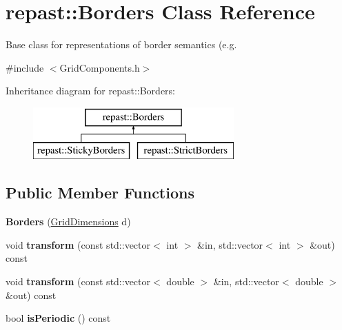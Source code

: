 \hypertarget{classrepast_1_1_borders}{\section{repast\-:\-:Borders Class Reference}
\label{classrepast_1_1_borders}
}


Base class for representations of border semantics (e.\-g.  




{\ttfamily \#include $<$Grid\-Components.\-h$>$}

Inheritance diagram for repast\-:\-:Borders\-:\begin{figure}[H]
\begin{center}
\leavevmode
\includegraphics[height=2.000000cm]{classrepast_1_1_borders}
\end{center}
\end{figure}
\subsection*{Public Member Functions}
\begin{DoxyCompactItemize}
\item 
\hypertarget{classrepast_1_1_borders_ac8b1f8a3e7fed24eb7b6b301decaf704}{{\bfseries Borders} (\hyperlink{classrepast_1_1_grid_dimensions}{Grid\-Dimensions} d)}\label{classrepast_1_1_borders_ac8b1f8a3e7fed24eb7b6b301decaf704}

\item 
\hypertarget{classrepast_1_1_borders_a715ad00551f06f2f142fc40c5bfd711b}{void {\bfseries transform} (const std\-::vector$<$ int $>$ \&in, std\-::vector$<$ int $>$ \&out) const }\label{classrepast_1_1_borders_a715ad00551f06f2f142fc40c5bfd711b}

\item 
\hypertarget{classrepast_1_1_borders_a7400f48ce654bd8d88dde402b47a3e83}{void {\bfseries transform} (const std\-::vector$<$ double $>$ \&in, std\-::vector$<$ double $>$ \&out) const }\label{classrepast_1_1_borders_a7400f48ce654bd8d88dde402b47a3e83}

\item 
\hypertarget{classrepast_1_1_borders_af6602977a69a27b46e71ca8da5aeb259}{bool {\bfseries is\-Periodic} () const }\label{classrepast_1_1_borders_af6602977a69a27b46e71ca8da5aeb259}

\end{DoxyCompactItemize}
